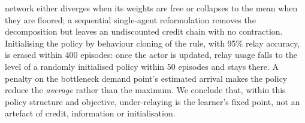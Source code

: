 \documentclass[final,5p,times,twocolumn]{elsarticle}
\begin{document}
network either diverges when its weights are free or collapses to the mean when they are floored;
a sequential single-agent reformulation removes the decomposition but leaves an undiscounted
credit chain with no contraction. Initialising the policy by behaviour cloning of the rule, with
95\% relay accuracy, is erased within 400 episodes: once the actor is updated, relay usage falls to
the level of a randomly initialised policy within 50 episodes and stays there. A penalty on the
bottleneck demand point's estimated arrival makes the policy reduce the \emph{average} rather than
the maximum. We conclude that, within this policy structure and objective, under-relaying is the
learner's fixed point, not an artefact of credit, information or initialisation.

\begin{table}[t]
\centering
\caption{Interventions that did not remove the relay-limited deficit, numbered as in the text.
Cells give the range over seeds of the paired median difference against the rule (positive:
learned slower) and, in parentheses, the number of seeds whose difference is significant at
$p<0.05$ (Wilcoxon signed-rank) over the number of seeds trained. The reference row is the
proposed policy against the tuned rule (Table~\ref{tab:paired}); the variant rows were
evaluated against the rule with its pre-tuning recovery parameters ($k_{\mathrm{stall}}=60$,
$h_{\mathrm{hold}}=40$), against which the proposed policy measured $+40$, $-54$ and $+0$, so
differences of a few tens of steps between the reference row and a variant row are not
meaningful.}
\label{tab:negative}
\scriptsize
\setlength{\tabcolsep}{3pt}

\end{table}
\end{document}
